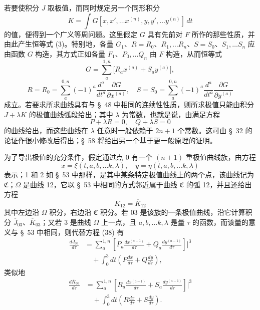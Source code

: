 \documentclass[11pt,a4paper,leqno]{article}
\begin{document}
若要使积分 $J$ 取极值，而同时规定另一个同形积分
\[
K=\int G[x,x',\ldots x^{(n)},y,y',\ldots y^{(n)}]\,dt
\]
的值，便得到一个广义等周问题。这里假定 $G$ 具有先前对 $F$ 所作的那些性质，并由此产生恒等式 (3)。特别地，各量 $G_1$、$R=R_0$、$R_1,\ldots R_n$、$S=S_0$、$S_1,\ldots S_n$ 应由函数 $G$ 构造，其方式正如各量 $F_1$、$P_0,\ldots Q_n$ 由 $F$ 构造，从而恒等式
\[
G=\sum_a^{1,n}\bigl[R_ax^{(a)}+S_ay^{(a)}\bigr],
\]
\[
R=R_0=\sum_a^{0,n}(-1)^a\frac{d^a}{dt^a}\frac{\partial G}{\partial x^{(a)}},
\quad
S=S_0=\sum_a^{0,n}(-1)^a\frac{d^a}{dt^a}\frac{\partial G}{\partial y^{(a)}}
\]
成立。若要求所求曲线具有与 \S~48 中相同的连续性性质，则所求极值只能由积分 $J+\lambda K$ 的极值曲线弧段给出；其中 $\lambda$ 为常数，也就是说，由满足方程
\[
P+\lambda R=0,\quad Q+\lambda S=0
\]
的曲线给出，而这些曲线在 $\lambda$ 任意时一般依赖于 $2n+1$ 个常数。这可由 \S~32 的论证作很小修改后得出；\S~58 将给出另一个基于更一般原理的证明。

为了导出极值的充分条件，假定通过点 0 有一个 $(n+1)$ 重极值曲线族，由方程
\[
x=\xi(t,a,b,\ldots k,\lambda),\quad
y=\eta(t,a,b,\ldots k,\lambda)
\]
表示；1 和 2 如 \S~53 中那样，是其中某条特定极值曲线上的两个点，该曲线记为 $\mathfrak{C}$；$\Omega$ 是曲线 12，它以 \S~53 中相同的方式邻近属于曲线 $\mathfrak{C}$ 的弧 12，并且还给出方程
\begin{equation}\tag{45}
K_{12}=\overline{K}_{12}
\end{equation}
其中左边沿 $\Omega$ 积分，右边沿 $\mathfrak{C}$ 积分。若 03 是该族的一条极值曲线，沿它计算积分 $\overline{J}_{03}$、$\overline{K}_{03}$；又若 3 是曲线 $\Omega$ 上一点，且 $a,b,\ldots k,\lambda$ 是量 $\tau$ 的函数，而该量的意义与 \S~53 中相同，则代替方程 (38) 有
\begin{equation}\tag{46}
\begin{aligned}
\frac{d\overline{J}_{03}}{d\tau}
&=\sum_a^{1,n}\left[P_a\frac{dx^{(a-1)}}{d\tau}
+Q_a\frac{dy^{(a-1)}}{d\tau}\right]\bigg|^3\\
&\quad+\int_0^3dt\left(P\frac{dx}{d\tau}+Q\frac{dy}{d\tau}\right),
\end{aligned}
\end{equation}
类似地
\begin{equation}\tag{47}
\begin{aligned}
\frac{d\overline{K}_{03}}{d\tau}
&=\sum_a^{1,n}\left[R_a\frac{dx^{(a-1)}}{d\tau}
+S_a\frac{dy^{(a-1)}}{d\tau}\right]\bigg|^3\\
&\quad+\int_0^3dt\left(R\frac{dx}{d\tau}+S\frac{dy}{d\tau}\right).
\end{aligned}
\end{equation}
\end{document}
